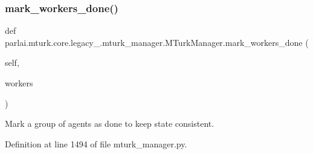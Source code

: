 \subsubsection{\texorpdfstring{mark\+\_\+workers\+\_\+done()}{mark\_workers\_done()}}
{\footnotesize\ttfamily def parlai.\+mturk.\+core.\+legacy\+\_.\+mturk\+\_\+manager.\+M\+Turk\+Manager.\+mark\+\_\+workers\+\_\+done (\begin{DoxyParamCaption}\item[{}]{self,  }\item[{}]{workers }\end{DoxyParamCaption})}

\begin{DoxyVerb}Mark a group of agents as done to keep state consistent.
\end{DoxyVerb}
 

Definition at line 1494 of file mturk\+\_\+manager.\+py.


